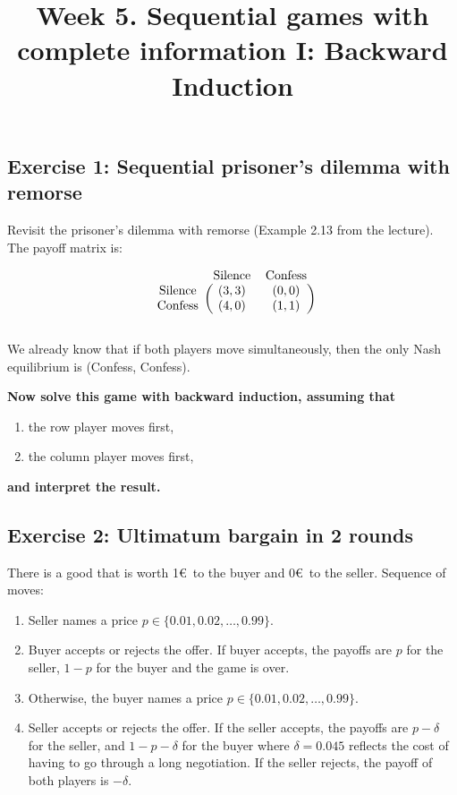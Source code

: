 \documentclass[10pt]{article}
\title{\textbf{Week 5.} Sequential games with complete information I: Backward Induction}
\date{}
\begin{document}
\maketitle


\subsection*{Exercise 1: Sequential prisoner's dilemma with remorse}

Revisit the prisoner's dilemma with remorse (Example 2.13 from the lecture). The
payoff matrix is:

\begin{equation*}
    \begin{blockarray}{ccc}
        & \text{Silence} & \text{Confess} \\
        \begin{block}{c(cc)}
            \text{Silence} & (3, 3) & (0, 0) \\
            \text{Confess} & (4, 0) & (1, 1) \\
        \end{block}
    \end{blockarray}
\end{equation*}

We already know that if both players move simultaneously, then the only Nash
equilibrium is (Confess, Confess).

\textbf{Now solve this game with backward induction, assuming that}

\begin{enumerate}
    \item the row player moves first,
    \item the column player moves first,
\end{enumerate}

\textbf{and interpret the result.}

\subsection*{Exercise 2: Ultimatum bargain in 2 rounds}

There is a good that is worth 1\euro~to the buyer and 0\euro~to the seller.
Sequence of moves:

\begin{enumerate}
    \item Seller names a price \(p \in \{0.01, 0.02, \dots, 0.99\}\).
    \item Buyer accepts or rejects the offer. If buyer accepts, the payoffs are
    \(p\) for the seller, \(1 - p\) for the buyer and the game is over.
    \item Otherwise, the buyer names a price \(p \in \{0.01, 0.02, \dots,
    0.99\}\).
    \item Seller accepts or rejects the offer. If the seller accepts, the
    payoffs are \(p - \delta\) for the seller, and \(1 - p - \delta\) for the buyer
    where \(\delta=0.045\) reflects the cost of having to go through a long
    negotiation. If the seller rejects, the payoff of both players is
    \(-\delta\).
\end{enumerate}
\end{document}
